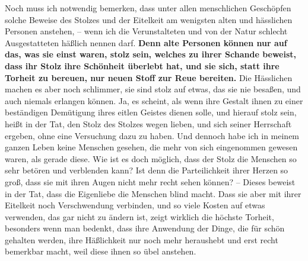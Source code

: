 Noch muss ich notwendig bemerken, dass unter allen menschlichen Geschöpfen
solche
Beweise des Stolzes und der Eitelkeit am wenigsten  alten und hässlichen Personen
anstehen, -- wenn ich die Verunstalteten und von der Natur schlecht
Ausgestatteten häßlich nennen darf. \textbf{Denn alte Personen können nur auf
das, was
sie einst waren, stolz sein, welches zu ihrer Schande beweist, dass ihr Stolz
ihre Schönheit überlebt hat, und sie sich, statt ihre Torheit zu bereuen, nur
neuen Stoff zur Reue bereiten.} Die Hässlichen machen es aber noch schlimmer,
sie
sind stolz auf etwas, das sie nie besaßen, und auch niemals erlangen können. Ja,
es scheint, als wenn ihre Gestalt ihnen zu einer beständigen Demütigung ihres
eitlen Geistes dienen solle, und hierauf stolz sein, heißt in der Tat, den
Stolz des Stolzes wegen lieben, und sich seiner Herrschaft ergeben, ohne eine
Versuchung dazu zu haben. Und dennoch habe ich in meinem ganzen Leben keine
Menschen gesehen, die mehr von sich eingenommen gewesen waren, als gerade diese.
Wie ist es doch möglich, dass der Stolz die Menschen so sehr betören und
verblenden kann? Ist denn die Parteilichkeit ihrer Herzen so groß, dass sie mit
ihren Augen nicht mehr recht sehen können? -- Dieses beweist in der Tat, dass
die Eigenliebe die Menschen blind macht. Dass sie aber mit ihrer Eitelkeit noch
Verschwendung verbinden, und so viele Kosten auf etwas verwenden, das gar nicht
zu ändern ist, zeigt wirklich die höchste Torheit, besonders wenn man bedenkt,
dass ihre Anwendung der Dinge, die für schön gehalten werden, ihre Häßlichkeit
nur noch mehr heraushebt und erst recht bemerkbar macht, weil diese ihnen so
übel anstehen.

\medskip

